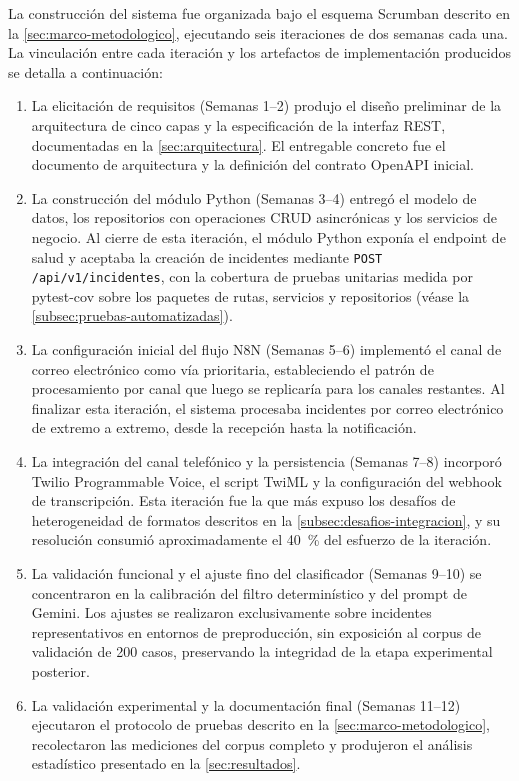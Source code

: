 La construcción del sistema fue organizada bajo el esquema Scrumban descrito en la \autoref{sec:marco-metodologico}, ejecutando seis iteraciones de dos semanas cada una. La vinculación entre cada iteración y los artefactos de implementación producidos se detalla a continuación:

\begin{enumerate}[label=Iteración \arabic*:, leftmargin=*]
  \item La elicitación de requisitos (Semanas 1--2) produjo el diseño preliminar de la arquitectura de cinco capas y la especificación de la interfaz REST, documentadas en la \autoref{sec:arquitectura}. El entregable concreto fue el documento de arquitectura y la definición del contrato OpenAPI inicial.
  \item La construcción del módulo Python (Semanas 3--4) entregó el modelo de datos, los repositorios con operaciones CRUD asincrónicas y los servicios de negocio. Al cierre de esta iteración, el módulo Python exponía el endpoint de salud y aceptaba la creación de incidentes mediante \texttt{POST /api/v1/incidentes}, con la cobertura de pruebas unitarias medida por pytest-cov sobre los paquetes de rutas, servicios y repositorios (véase la \autoref{subsec:pruebas-automatizadas}).
  \item La configuración inicial del flujo N8N (Semanas 5--6) implementó el canal de correo electrónico como vía prioritaria, estableciendo el patrón de procesamiento por canal que luego se replicaría para los canales restantes. Al finalizar esta iteración, el sistema procesaba incidentes por correo electrónico de extremo a extremo, desde la recepción hasta la notificación.
  \item La integración del canal telefónico y la persistencia (Semanas 7--8) incorporó Twilio Programmable Voice, el script TwiML y la configuración del webhook de transcripción. Esta iteración fue la que más expuso los desafíos de heterogeneidad de formatos descritos en la \autoref{subsec:desafios-integracion}, y su resolución consumió aproximadamente el 40~\% del esfuerzo de la iteración.
  \item La validación funcional y el ajuste fino del clasificador (Semanas 9--10) se concentraron en la calibración del filtro determinístico y del prompt de Gemini. Los ajustes se realizaron exclusivamente sobre incidentes representativos en entornos de preproducción, sin exposición al corpus de validación de 200 casos, preservando la integridad de la etapa experimental posterior.
  \item La validación experimental y la documentación final (Semanas 11--12) ejecutaron el protocolo de pruebas descrito en la \autoref{sec:marco-metodologico}, recolectaron las mediciones del corpus completo y produjeron el análisis estadístico presentado en la \autoref{sec:resultados}.
\end{enumerate}

